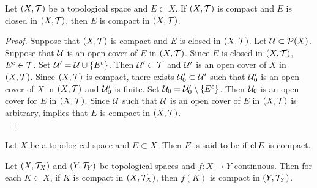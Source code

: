 \documentclass{book}
\begin{document}
	\begin{ex}
		Let $(X, \mathcal{T})$ be a topological space and $E \subset X$. If $(X, \mathcal{T})$ is compact and $E$ is closed in $(X, \mathcal{T})$, then $E$ is compact in $(X, \mathcal{T})$.
	\end{ex}

	\begin{proof}
		Suppose that $(X, \mathcal{T})$ is compact and $E$ is closed in $(X, \mathcal{T})$. Let $\mathcal{U} \subset \mathcal{P}(X)$. Suppose that $\mathcal{U}$ is an open cover of $E$ in $(X, \mathcal{T})$. Since $E$ is closed in $(X, \mathcal{T})$, $E^c \in \mathcal{T}$. Set $\mathcal{U}' = \mathcal{U} \cup \{E^c\}$. Then $\mathcal{U}' \subset \mathcal{T}$ and $\mathcal{U}'$ is an open cover of $X$ in $(X, \mathcal{T})$.  Since $(X, \mathcal{T})$ is compact, there exists $\mathcal{U}'_0 \subset \mathcal{U}'$ such that $\mathcal{U}'_0$ is an open cover of $X$ in $(X, \mathcal{T})$ and $\mathcal{U}'_0$ is finite. Set $\mathcal{U}_0 = \mathcal{U}'_0 \setminus \{E^c\}$. Then $\mathcal{U}_0$ is an open cover for $E$ in $(X, \mathcal{T})$. Since $\mathcal{U}$ such that $\mathcal{U}$ is an open cover of $E$ in $(X, \mathcal{T})$ is arbitrary,  implies that $E$ is compact in $(X, \mathcal{T})$.
		\\
	\end{proof}
	
	
	
	
	\begin{defn} 
		Let $X$ be a topological space and $E \subset X$. Then $E$ is said to be  if $\operatorname{cl} E$ is compact.
	\end{defn}

	\begin{ex}
		Let $(X, \mathcal{T}_X)$ and $(Y, \mathcal{T}_Y)$ be topological spaces and $f:X \rightarrow Y$ continuous. Then for each $K \subset X$, if $K$ is compact in $(X, \mathcal{T}_X)$, then $f(K)$ is compact in $(Y, \mathcal{T}_Y)$.
	\end{ex}
\end{document}

